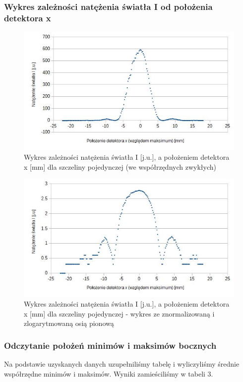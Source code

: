 \documentclass{article}
\begin{document}
\subsubsection{Wykres zależności natężenia światła I od położenia detektora x}

\begin{figure}[h]
	\centering
	\includegraphics[scale=0.8]{ch01a}
	\caption{Wykres zależności natężenia światła I [j.u.], a położeniem detektora x [mm] dla szczeliny pojedynczej (we współrzędnych zwykłych)}
\end{figure}

\clearpage

\begin{figure}[h]
	\centering
	\includegraphics[scale=0.8]{ch02a}
	\caption{Wykres zależności natężenia światła I [j.u.], a położeniem detektora x [mm] dla szczeliny pojedynczej - wykres ze znormalizowaną i zlogarytmowaną osią pionową}
\end{figure}

\subsubsection{Odczytanie położeń minimów i maksimów bocznych}
Na podstawie uzyskanych danych uzupełniliśmy tabelę i wyliczyliśmy średnie współrzędne minimów i maksimów. Wyniki zamieściliśmy w tabeli 3.
\end{document}
